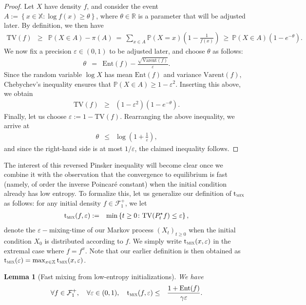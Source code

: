 \documentclass[12pt,final]{article}
\newtheorem{lemma}{Lemma}[section]
\numberwithin{equation}{section}
\newcommand{\TV}{\mathrm {TV}}
\newcommand{\dR}{\mathbb {R}}
\newcommand{\Ent}{\mathrm{Ent}}
\newcommand{\Varent}{\mathrm{Varent}}
\newcommand{\PP}{{\mathbb{P}}}
\newcommand{\cF}{\mathcal {F}}
\newcommand{\dX}{\mathbb{X}}
\newcommand{\tmix}{{\rm t}_{\textsc{mix}}}
\begin{document}
\begin{proof}Let $X$ have density $f$, and consider the event $A := \left\{x\in \dX\colon  \log f(x)\ge \theta\right\}$, where $\theta\in\dR$ is a parameter that will be adjusted later. By definition, we then have
\begin{eqnarray*}
\TV(f) & \ge & \PP(X\in A)-\pi(A) \ = \ \sum_{x\in A}\PP(X=x)\left(1-\frac{1}{f(x)}\right) \ \ge \ \PP(X\in A)\left(1-e^{-\theta}\right).
\end{eqnarray*}
We now fix a precision $\varepsilon\in(0,1)$ to be adjusted later, and choose $\theta$ as follows:
\begin{eqnarray*}
\theta & = & \Ent(f)-\frac{\sqrt{\Varent(f)}}{\varepsilon}.
\end{eqnarray*}
Since the random variable $\log X$ has mean $\Ent(f)$ and variance $\Varent(f)$,  Chebychev's inequality ensures that $\PP\left(X\in A\right)  \ge    1-\varepsilon^2$. Inserting this above, we obtain
\begin{eqnarray*}
\TV(f) & \ge & (1-\varepsilon^2)\left(1-e^{-\theta}\right).
\end{eqnarray*}
Finally, let us choose $\varepsilon:=1-\TV(f)$. Rearranging the above inequality, we arrive at
\begin{eqnarray*}
\theta & \le & \log\left(1+\frac{1}{\varepsilon}\right), 
\end{eqnarray*}
and since the right-hand side is at most $1/\varepsilon$, the claimed inequality follows.  
\end{proof}
The interest of this reversed Pinsker inequality will become clear once we combine it with the observation that the convergence to equilibrium is fast (namely, of order the inverse Poincaré constant) when the initial condition already has low entropy. To formalize this, let us generalize our definition of $\tmix$ as follows: for any initial density $f\in\cF_1^+$, we let
\begin{eqnarray}
\tmix(f,\varepsilon) & := & \min\left\{t\ge 0\colon \TV(P_t^\star f) \le \varepsilon\right\},
\end{eqnarray}
denote the $\varepsilon-$mixing-time of our Markov process $(X_t)_{t\ge 0}$ when the initial condition $X_0$ is distributed according to $f$. We simply write $\tmix(x,\varepsilon)$ in the extremal case where $f=f^x$. Note that our earlier definition is then obtained as  $\tmix(\varepsilon)=\max_{x\in\dX}\tmix(x,\varepsilon)$.
\begin{lemma}[Fast mixing from low-entropy initializations]\label{lm:fastmixing} We have
\begin{eqnarray*}
\forall f\in\cF_1^+,\quad\forall \varepsilon\in(0,1),\quad 
\tmix(f,\varepsilon) & \le & \frac{1+\Ent(f)}{\gamma\varepsilon}.
\end{eqnarray*}
\end{lemma}
\end{document}
